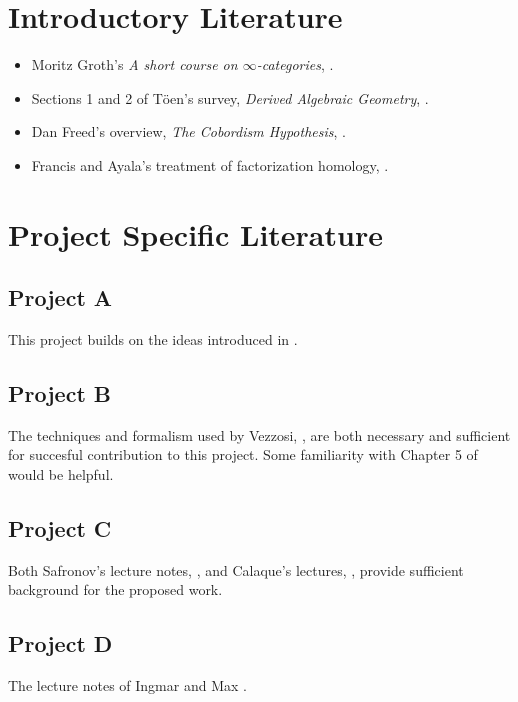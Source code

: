 \documentclass[11pt]{amsart}
\begin{document}
\section*{Introductory Literature}
\begin{itemize}
\item Moritz Groth's {\it A short course on $\infty$-categories}, \cite{MG}.
\item Sections 1 and 2 of T\"oen's survey, {\it Derived Algebraic Geometry}, \cite{Toen}.
\item Dan Freed's overview, {\it The Cobordism Hypothesis}, \cite{DF}.
\item Francis and Ayala's treatment of factorization homology, \cite{AF1}.
\end{itemize}



\section*{Project Specific Literature}

\subsection*{Project A} This project builds on the ideas introduced in \cite{TV1}.

\subsection*{Project B} The techniques and formalism used by Vezzosi, \cite{GV}, are both necessary and sufficient for succesful contribution to this project. Some familiarity with Chapter 5 of \cite{CG2} would be helpful.

\subsection*{Project C} Both Safronov's lecture notes, \cite{PS}, and Calaque's lectures, \cite{DC}, provide sufficient background for the proposed work.

\subsection*{Project D} The lecture notes of Ingmar and Max \cite{MS}. 






\end{document}
